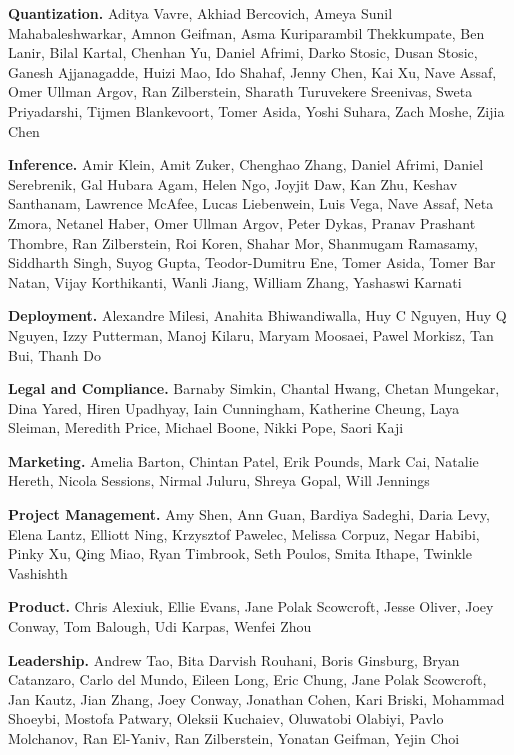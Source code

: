 \textbf{Quantization.} Aditya Vavre, Akhiad Bercovich, Ameya Sunil Mahabaleshwarkar, Amnon Geifman, Asma Kuriparambil Thekkumpate, Ben Lanir, Bilal Kartal, Chenhan Yu, Daniel Afrimi, Darko Stosic, Dusan Stosic, Ganesh Ajjanagadde, Huizi Mao, Ido Shahaf, Jenny Chen, Kai Xu, Nave Assaf, Omer Ullman Argov, Ran Zilberstein, Sharath Turuvekere Sreenivas, Sweta Priyadarshi, Tijmen Blankevoort, Tomer Asida, Yoshi Suhara,  Zach Moshe, Zijia Chen

\textbf{Inference.} Amir Klein, Amit Zuker, Chenghao Zhang, Daniel Afrimi, Daniel Serebrenik, Gal Hubara Agam, Helen Ngo, Joyjit Daw, Kan Zhu, Keshav Santhanam, Lawrence McAfee, Lucas Liebenwein, Luis Vega, Nave Assaf, Neta Zmora, Netanel Haber, Omer Ullman Argov, Peter Dykas, Pranav Prashant Thombre, Ran Zilberstein, Roi Koren, Shahar Mor, Shanmugam Ramasamy, Siddharth Singh, Suyog Gupta, Teodor-Dumitru Ene, Tomer Asida, Tomer Bar Natan, Vijay Korthikanti, Wanli Jiang, William Zhang, Yashaswi Karnati


\textbf{Deployment.} Alexandre Milesi, Anahita Bhiwandiwalla, Huy C Nguyen, Huy Q Nguyen, Izzy Putterman, Manoj Kilaru, Maryam Moosaei, Pawel Morkisz, Tan Bui, Thanh Do

\textbf{Legal and Compliance.} Barnaby Simkin, Chantal Hwang, Chetan Mungekar, Dina Yared, Hiren Upadhyay, Iain Cunningham, Katherine Cheung, Laya Sleiman, Meredith Price, Michael Boone, Nikki Pope, Saori Kaji

\textbf{Marketing.} Amelia Barton, Chintan Patel, Erik Pounds, Mark Cai, Natalie Hereth, Nicola Sessions, Nirmal Juluru, Shreya Gopal, Will Jennings

\textbf{Project Management.} Amy Shen, Ann Guan, Bardiya Sadeghi, Daria Levy, Elena Lantz, Elliott Ning, Krzysztof Pawelec, Melissa Corpuz, Negar Habibi, Pinky Xu, Qing Miao, Ryan Timbrook, Seth Poulos, Smita Ithape, Twinkle Vashishth

\textbf{Product.}  Chris Alexiuk, Ellie Evans, Jane Polak Scowcroft, Jesse Oliver, Joey Conway, Tom Balough, Udi Karpas, Wenfei Zhou

\textbf{Leadership.} Andrew Tao, Bita Darvish Rouhani, Boris Ginsburg, Bryan Catanzaro, Carlo del Mundo, Eileen Long, Eric Chung, Jane Polak Scowcroft, Jan Kautz, Jian Zhang, Joey Conway, Jonathan Cohen, Kari Briski, Mohammad Shoeybi, Mostofa Patwary, Oleksii Kuchaiev, Oluwatobi Olabiyi, Pavlo Molchanov, Ran El-Yaniv, Ran Zilberstein, Yonatan Geifman, Yejin Choi



\newpage